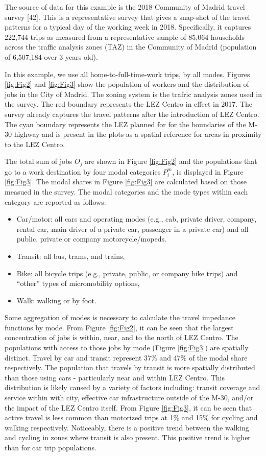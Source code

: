 \documentclass[10pt,letterpaper]{article}
\providecommand{\tightlist}{%
  \setlength{\itemsep}{0pt}\setlength{\parskip}{0pt}}
\begin{document}
The source of data for this example is the 2018 Community of Madrid
travel survey {[}42{]}. This is a representative survey that gives a
snap-shot of the travel patterns for a typical day of the working week
in 2018. Specifically, it captures 222,744 trips as measured from a
representative sample of 85,064 households across the traffic analysis
zones (TAZ) in the Community of Madrid (population of 6,507,184 over 3
years old).

In this example, we use all home-to-full-time-work trips, by all modes.
Figures \ref{fig:Fig2} and \ref{fig:Fig3} show the population of workers
and the distribution of jobs in the City of Madrid. The zoning system is
the trafric analysis zones used in the survey. The red boundary
represents the LEZ Centro in effect in 2017. The survey already captures
the travel patterns after the introduction of LEZ Centro. The cyan
boundary represents the LEZ planned for for the boundaries of the M-30
highway and is present in the plots as a spatial reference for areas in
proximity to the LEZ Centro.

The total sum of jobs \(O_j\) are shown in Figure \ref{fig:Fig2} and the
populations that go to a work destination by four modal categories
\(P^m_i\), is displayed in Figure \ref{fig:Fig3}. The modal shares in
Figure \ref{fig:Fig3} are calculated based on those measued in the
survey. The modal categories and the mode types within each category are
reported as follows:

\begin{itemize}
\tightlist
\item
  Car/motor: all cars and operating modes (e.g., cab, private driver,
  company, rental car, main driver of a private car, passenger in a
  private car) and all public, private or company motorcycle/mopeds.
\item
  Transit: all bus, trams, and trains,
\item
  Bike: all bicycle trips (e.g., private, public, or company bike trips)
  and ``other'' types of micromobility options,
\item
  Walk: walking or by foot.
\end{itemize}

Some aggregation of modes is necessary to calculate the travel impedance
functions by mode. From Figure \ref{fig:Fig2}, it can be seen that the
largest concentration of jobs is within, near, and to the north of LEZ
Centro. The populations with access to those jobs by mode (Figure
\ref{fig:Fig3}) are spatially distinct. Travel by car and transit
represent 37\% and 47\% of the modal share respectively. The population
that travels by transit is more spatially distributed than those using
cars - particularly near and within LEZ Centro. This distribution is
likely caused by a variety of factors including: transit coverage and
service within with city, effective car infrastructure outside of the
M-30, and/or the impact of the LEZ Centro itself. From Figure
\ref{fig:Fig3}, it can be seen that active travel is less common than
motorized trips at 1\% and 15\% for cycling and walking respectively.
Noticeably, there is a positive trend between the walking and cycling in
zones where transit is also present. This positive trend is higher than
for car trip populations.
\end{document}
